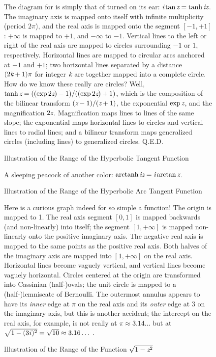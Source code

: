 \clearpage

\begin{figure}
\caption{Illustration of the Range of the Hyperbolic Tangent Function}
\small\noindent
The diagram for  is simply that of  turned on its ear:
$\emph{i} \tan \emph{z} = \tanh \emph{i}\emph{z}$.
The imaginary axis is mapped onto itself with infinite multiplicity (period $2\pi$),
and the real axis is mapped onto the segment $[-1,+1]$:
$+\infty$ is mapped to $+1$, and $-\infty$ to $-1$.
Vertical lines to the left or right of the real axis
are mapped to circles surrounding $-1$ or $1$, respectively.
Horizontal lines are mapped to circular arcs anchored at $-1$ and $+1$;
two horizontal lines separated by a distance $(2\emph{k}+1)\pi$ for integer $\emph{k}$ are
together mapped into a complete circle.  How do we know these really are circles?
Well, $\tanh \emph{z} = ((\exp 2\emph{z})-1)/((\exp 2\emph{z})+1)$, which is the composition of the
bilinear transform $(\emph{z}-1)/(\emph{z}+1)$, the exponential $\exp \emph{z}$,
and the magnification $2\emph{z}$.
Magnification maps lines to lines of the same slope; the exponential maps
horizontal lines to circles and vertical lines to radial lines;
and a bilinear transform maps generalized circles (including lines) to
generalized circles.  Q.E.D.
\end{figure}

\clearpage

\begin{figure}
\caption{Illustration of the Range of the Hyperbolic Arc Tangent Function}
\label{ATANH-PLOT}
\small\noindent
A sleeping peacock of another color: $\mathop\textrm{arctanh}\nolimits \emph{i}\emph{z} = \emph{i} \arctan \emph{z}$.
\end{figure}

\clearpage

\begin{figure}
\caption{Illustration of the Range of the Function $\protect\sqrt{1-\emph{z}^2}$}
\small\noindent
Here is a curious graph indeed for so simple a function!
The origin is mapped to 1.  The real axis segment $[0,1]$ is
mapped backwards (and non-linearly) into itself; the segment $[1,+\infty]$
is mapped non-linearly onto the positive imaginary axis.
The negative real axis is mapped to the same points as the positive real axis.
Both halves of the imaginary axis are mapped into $[1,+\infty]$ on the real axis.
Horizontal lines become vaguely vertical, and
vertical lines become vaguely horizontal.
Circles centered at the origin are transformed into Cassinian \hbox{(half-)ovals}; the unit
circle is mapped to a \hbox{(half-)lemniscate} of Bernoulli.  The outermost annulus appears
to have its \emph{inner} edge at $\pi$ on the real axis and its \emph{outer}
edge at 3 on the imaginary axis, but this is another accident; the intercept
on the real axis, for example, is not really at $\pi\approx 3.14\ldots$ but
at $\sqrt{1-(3\emph{i\/})^2}=\sqrt{10}\approx 3.16\ldots\,\hbox{}$.
\end{figure}

